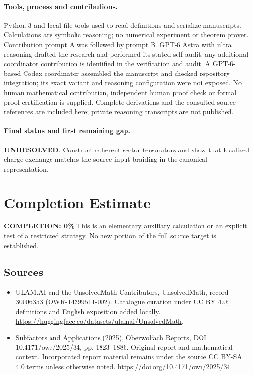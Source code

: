 \documentclass[11pt]{article}
\begin{document}
\paragraph{Tools, process and contributions.}
Python 3 and local file tools used to read definitions and serialize manuscripts. Calculations are symbolic reasoning; no numerical experiment or theorem prover. Contribution prompt A was followed by prompt B. GPT-6 Astra with ultra reasoning drafted the research and performed its stated self-audit; any additional coordinator contribution is identified in the verification and audit. A GPT-6-based Codex coordinator assembled the manuscript and checked repository integration; its exact variant and reasoning configuration were not exposed. No human mathematical contribution, independent human proof check or formal proof certification is supplied. Complete derivations and the consulted source references are included here; private reasoning transcripts are not published.

\paragraph{Final status and first remaining gap.}
\textbf{UNRESOLVED}. Construct coherent sector tensorators and show that localized charge exchange matches the source input braiding in the canonical representation.

\section{Completion Estimate}
\noindent\textbf{COMPLETION: 0\%}
This is an elementary auxiliary calculation or an explicit test of a restricted strategy. No new portion of the full source target is established.

\subsection{Sources}
\begin{itemize}
\item[\hypertarget{source:30006353:1}{S1}] ULAM.AI and the UnsolvedMath Contributors, UnsolvedMath, record 30006353 (OWR-14299511-002). Catalogue curation under CC BY 4.0; definitions and English exposition added locally.
\url{https://huggingface.co/datasets/ulamai/UnsolvedMath}.
\item[\hypertarget{source:30006353:2}{S2}] Subfactors and Applications (2025), Oberwolfach Reports, DOI 10.4171/owr/2025/34, pp. 1823--1886. Original report and mathematical context. Incorporated report material remains under the source CC BY-SA 4.0 terms unless otherwise noted.
\url{https://doi.org/10.4171/owr/2025/34}.
\end{itemize}
\label{end:30006353}
\end{document}
